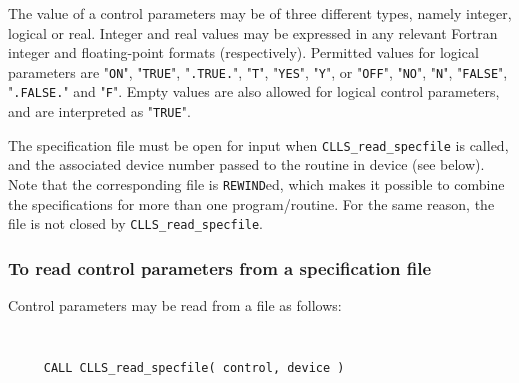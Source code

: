 \documentclass{galahad}
\newcommand{\packagename}{CLLS}
\begin{document}
The value of a control parameters may be of three different types, namely
integer, logical or real.
Integer and real values may be expressed in any relevant Fortran integer and
floating-point formats (respectively). Permitted values for logical
parameters are "{\tt ON}", "{\tt TRUE}", "{\tt .TRUE.}", "{\tt T}",
"{\tt YES}", "{\tt Y}", or "{\tt OFF}", "{\tt NO}",
"{\tt N}", "{\tt FALSE}", "{\tt .FALSE.}" and "{\tt F}".
Empty values are also allowed for
logical control parameters, and are interpreted as "{\tt TRUE}".

The specification file must be open for
input when {\tt \packagename\_read\_specfile}
is called, and the associated device number
passed to the routine in device (see below).
Note that the corresponding
file is {\tt REWIND}ed, which makes it possible to combine the specifications
for more than one program/routine.  For the same reason, the file is not
closed by {\tt \packagename\_read\_specfile}.

\subsubsection{To read control parameters from a specification file}
\label{readspec}

Control parameters may be read from a file as follows:
\hskip0.5in

\def\baselinestretch{0.8}
{\tt
\begin{verbatim}
     CALL CLLS_read_specfile( control, device )
\end{verbatim}
}
\def\baselinestretch{1.0}
\end{document}
